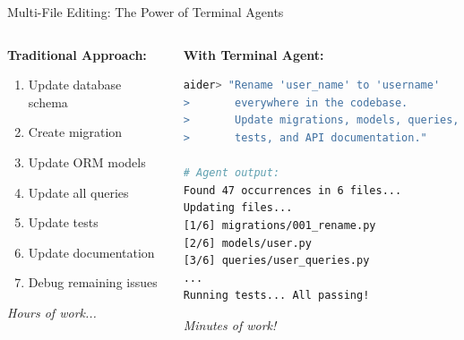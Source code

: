 \documentclass[aspectratio=169,11pt]{beamer}
\begin{document}
\begin{frame}[fragile]{Multi-File Editing: The Power of Terminal Agents}
    \begin{columns}[T]
        \begin{column}{0.45\textwidth}
            \textbf{Traditional Approach:}
            \begin{enumerate}
                \item Update database schema
                \item Create migration
                \item Update ORM models
                \item Update all queries
                \item Update tests
                \item Update documentation
                \item Debug remaining issues
            \end{enumerate}
            \textcolor{UofSCRose}{\textit{Hours of work...}}
        \end{column}
        \begin{column}{0.52\textwidth}
            \textbf{With Terminal Agent:}
            \begin{lstlisting}[language=bash, basicstyle=\ttfamily\tiny]
aider> "Rename 'user_name' to 'username'
>       everywhere in the codebase.
>       Update migrations, models, queries,
>       tests, and API documentation."

# Agent output:
Found 47 occurrences in 6 files...
Updating files...
[1/6] migrations/001_rename.py
[2/6] models/user.py
[3/6] queries/user_queries.py
...
Running tests... All passing!
            \end{lstlisting}
            \textcolor{UofSCHorseshoe}{\textit{Minutes of work!}}
        \end{column}
    \end{columns}

\end{frame}
\end{document}
